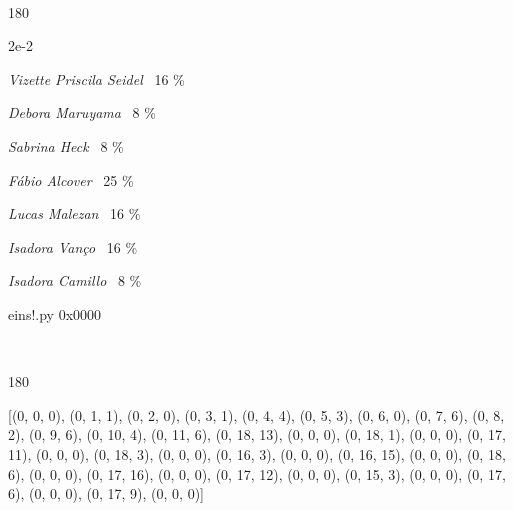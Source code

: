 \documentclass[12pt]{article}
\begin{document}
		  \pagebreak
			\ttfamily %

	\ 
	\vfill
	\begin{turn}{180}	
		\begin{minipage}{\textwidth}
			\centering
			{\Huge 2e-2}
		  
			\hfill
		  
			

\textit{Vizette Priscila Seidel}
	\ 16 \%

\textit{Debora Maruyama}
	\ 8 \%

\textit{Sabrina Heck}
	\ 8 \%

\textit{Fábio Alcover}
	\ 25 \%

\textit{Lucas Malezan}
	\ 16 \%

\textit{Isadora Vanço}
	\ 16 \%

\textit{Isadora Camillo}
	\ 8 \%

\bigskip

eins!.py
0x0000


		\end{minipage}	
	\end{turn}
	\vfill
	\

\pagebreak

	\begin{turn}{180}	
		\begin{minipage}{\textwidth}[(0, 0, 0), (0, 1, 1), (0, 2, 0), (0, 3, 1), (0, 4, 4), (0, 5, 3), (0, 6, 0), (0, 7, 6), (0, 8, 2), (0, 9, 6), (0, 10, 4), (0, 11, 6), (0, 18, 13), (0, 0, 0), (0, 18, 1), (0, 0, 0), (0, 17, 11), (0, 0, 0), (0, 18, 3), (0, 0, 0), (0, 16, 3), (0, 0, 0), (0, 16, 15), (0, 0, 0), (0, 18, 6), (0, 0, 0), (0, 17, 16), (0, 0, 0), (0, 17, 12), (0, 0, 0), (0, 15, 3), (0, 0, 0), (0, 17, 6), (0, 0, 0), (0, 17, 9), (0, 0, 0)]	  
				
		\end{minipage}	
	\end{turn} 

\pagebreak
\sffamily
\large
\end{document}
